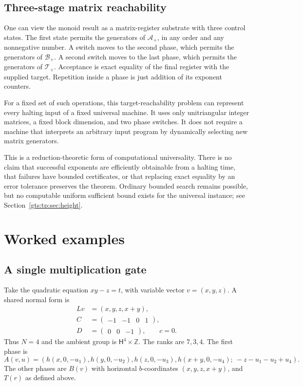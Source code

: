 \documentclass[11pt,letterpaper]{article}
\theoremstyle{definition}
\theoremstyle{remark}
\newcommand{\ZZ}{\mathbb Z}
\newcommand{\HH}{\mathsf H}
\newcommand{\calA}{\mathcal A}
\newcommand{\calB}{\mathcal B}
\newcommand{\calT}{\mathcal T}
\begin{document}
\subsection{Three-stage matrix reachability}
One can view the monoid result as a matrix-register substrate with three
control states. The first state permits the generators of $\calA_+$, in any
order and any nonnegative number. A switch moves to the second phase, which
permits the generators of $\calB_+$. A second switch moves to the last phase,
which permits the generators of $\calT_+$. Acceptance is exact equality of
the final register with the supplied target. Repetition inside a phase is
just addition of its exponent counters.

For a fixed set of such operations, this target-reachability problem can
represent every halting input of a fixed universal machine. It uses only
unitriangular integer matrices, a fixed block dimension, and two phase
switches. It does not require a machine that interprets an arbitrary input
program by dynamically selecting new matrix generators.

This is a reduction-theoretic form of computational universality. There is
no claim that successful exponents are efficiently obtainable from a
halting time, that failures have bounded certificates, or that replacing
exact equality by an error tolerance preserves the theorem. Ordinary
bounded search remains possible, but no computable uniform sufficient
bound exists for the universal instance; see Section~\ref{gts:tp:sec:height}.

\section{Worked examples}
\label{gts:tp:sec:examples}

\subsection{A single multiplication gate}
Take the quadratic equation $xy-z=t$, with variable vector
$v=(x,y,z)$. A shared normal form is
\begin{align*}
 Lv&=(x,y,z,x+y),\\
 C&=\begin{pmatrix}-1&-1&0&1\end{pmatrix},\\
 D&=\begin{pmatrix}0&0&-1\end{pmatrix},\qquad c=0.
\end{align*}
Thus $N=4$ and the ambient group is $\HH^4\times\ZZ$. The ranks are
$7,3,4$. The first phase is
\[
 A(v,u)=\left(h(x,0,-u_1),h(y,0,-u_2),h(z,0,-u_3),
 h(x+y,0,-u_4);\ -z-u_1-u_2+u_4\right).
\]
The other phases are $B(v)$ with horizontal $b$-coordinates
$(x,y,z,x+y)$, and $T(r)$ as defined above.
\end{document}
